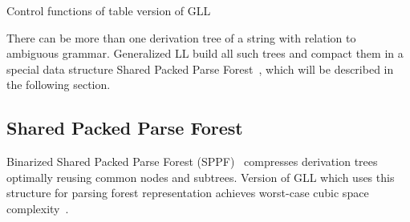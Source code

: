 \begin{algorithm}[h]
\begin{algorithmic}[1]
\caption{Control functions of table version of GLL}
\label{mainTblFunctions}
  \Else
  \EndIf
\EndFunction

       \Else 
       \EndIf
       \EndIf
  \EndCase
       \EndFor
  \EndCase
  \EndCase
  \EndCase
  \EndSwitch
\EndFunction

      \Else
      \EndIf
  \EndWhile
\EndFunction

\end{algorithmic}
\end{algorithm}

There can be more than one derivation tree of a string with relation to ambiguous grammar.
Generalized LL build all such trees and compact them in a special data structure Shared Packed Parse Forest~\cite{SPPF}, which will be described in the following section.

\subsection{Shared Packed Parse Forest}

Binarized Shared Packed Parse Forest (SPPF)~\cite{brnglr} compresses derivation trees optimally reusing common nodes and subtrees.
Version of GLL which uses this structure for parsing forest representation achieves worst-case cubic space complexity~\cite{gllParsingTree}.

